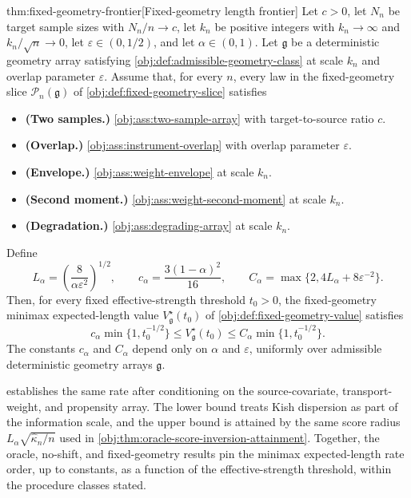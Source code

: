\begin{theoremv}{thm:fixed-geometry-frontier}[Fixed-geometry length frontier]
Let \(c>0\), let \(N_n\) be target sample sizes with \(N_n/n\to c\), let \(k_n\) be positive integers with \(k_n\to\infty\) and \(k_n/\sqrt n\to0\), let \(\varepsilon\in(0,1/2)\), and let \(\alpha\in(0,1)\).  Let \(\mathfrak g\) be a deterministic geometry array satisfying \cref{obj:def:admissible-geometry-class} at scale \(k_n\) and overlap parameter \(\varepsilon\).  Assume that, for every \(n\), every law in the fixed-geometry slice \(\mathcal P_n(\mathfrak g)\) of \cref{obj:def:fixed-geometry-slice} satisfies
\begin{itemize}
\item \textbf{(Two samples.)} \cref{obj:ass:two-sample-array} with target-to-source ratio \(c\).
\item \textbf{(Overlap.)} \cref{obj:ass:instrument-overlap} with overlap parameter \(\varepsilon\).
\item \textbf{(Envelope.)} \cref{obj:ass:weight-envelope} at scale \(k_n\).
\item \textbf{(Second moment.)} \cref{obj:ass:weight-second-moment} at scale \(k_n\).
\item \textbf{(Degradation.)} \cref{obj:ass:degrading-array} at scale \(k_n\).
\end{itemize}
Define
\[
L_\alpha=\left(\frac{8}{\alpha\varepsilon^2}\right)^{1/2},
\qquad
c_\alpha=\frac{3(1-\alpha)^2}{16},
\qquad
C_\alpha=\max\{2,4L_\alpha+8\varepsilon^{-2}\}.
\]
Then, for every fixed effective-strength threshold \(t_0>0\), the fixed-geometry minimax expected-length value \(V_{\mathfrak g}^\star(t_0)\) of \cref{obj:def:fixed-geometry-value} satisfies
\[
c_\alpha\min\{1,t_0^{-1/2}\}
\le
V_{\mathfrak g}^\star(t_0)
\le
C_\alpha\min\{1,t_0^{-1/2}\}.
\]
The constants \(c_\alpha\) and \(C_\alpha\) depend only on \(\alpha\) and \(\varepsilon\), uniformly over admissible deterministic geometry arrays \(\mathfrak g\).
\end{theoremv}

 establishes the same rate after conditioning on the source-covariate, transport-weight, and propensity array. The lower bound treats Kish dispersion as part of the information scale, and the upper bound is attained by the same score radius \(L_\alpha\sqrt{\widehat\kappa_n/n}\) used in \cref{obj:thm:oracle-score-inversion-attainment}. Together, the oracle, no-shift, and fixed-geometry results pin the minimax expected-length rate order, up to constants, as a function of the effective-strength threshold, within the procedure classes stated.
